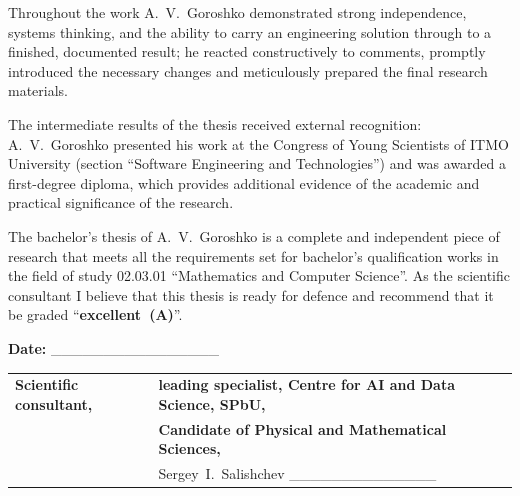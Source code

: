 \documentclass[12pt,a4paper]{article}
\begin{document}
Throughout the work A.~V.~Goroshko demonstrated strong independence,
systems thinking, and the ability to carry an engineering solution
through to a finished, documented result; he reacted constructively
to comments, promptly introduced the necessary changes and
meticulously prepared the final research materials.

The intermediate results of the thesis received external recognition:
A.~V.~Goroshko presented his work at the Congress of Young Scientists
of ITMO University (section ``Software Engineering and Technologies'')
and was awarded a first-degree diploma, which provides additional
evidence of the academic and practical significance of the research.

The bachelor's thesis of A.~V.~Goroshko is a complete and independent
piece of research that meets all the requirements set for bachelor's
qualification works in the field of study 02.03.01 ``Mathematics and
Computer Science''. As the scientific consultant I believe that this
thesis is ready for defence and recommend that it be graded
``\textbf{excellent~(A)}''.

\vspace{1.2em}

\noindent\textbf{Date:} \_\_\_\_\_\_\_\_\_\_\_\_\_\_\_\_

\vspace{2.5em}

\noindent\begin{tabular}{@{}p{5cm}p{9cm}@{}}
\textbf{Scientific consultant,} & \textbf{leading specialist, Centre for AI and Data Science, SPbU,} \\
& \textbf{Candidate of Physical and Mathematical Sciences,} \\
& Sergey~I.~Salishchev \hfill \_\_\_\_\_\_\_\_\_\_\_\_\_\_
\end{tabular}
\end{document}

